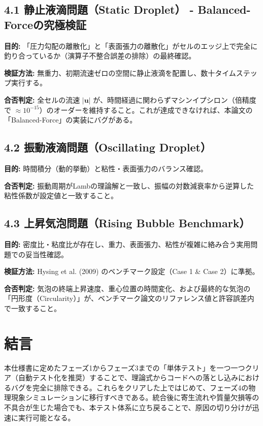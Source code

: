 \documentclass[12pt, a4paper, titlepage]{article}
\begin{document}
\subsection*{4.1 静止液滴問題（Static Droplet） - Balanced-Forceの究極検証}

\textbf{目的:} 「圧力勾配の離散化」と「表面張力の離散化」がセルのエッジ上で完全に釣り合っているか（演算子不整合誤差の排除）の最終確認。

\textbf{検証方法:} 無重力、初期流速ゼロの空間に静止液滴を配置し、数十タイムステップ実行する。

\textbf{合否判定:} 全セルの流速 $|\mathbf{u}|$ が、時間経過に関わらずマシンイプシロン（倍精度で $\approx 10^{-15}$）のオーダーを維持すること。これが達成できなければ、本論文の「Balanced-Force」の実装にバグがある。

\subsection*{4.2 振動液滴問題（Oscillating Droplet）}

\textbf{目的:} 時間積分（動的挙動）と粘性・表面張力のバランス確認。

\textbf{合否判定:} 振動周期がLambの理論解と一致し、振幅の対数減衰率から逆算した粘性係数が設定値と一致すること。

\subsection*{4.3 上昇気泡問題（Rising Bubble Benchmark）}

\textbf{目的:} 密度比・粘度比が存在し、重力、表面張力、粘性が複雑に絡み合う実用問題での妥当性確認。

\textbf{検証方法:} Hysing et al. (2009) のベンチマーク設定（Case 1 \& Case 2）に準拠。

\textbf{合否判定:} 気泡の終端上昇速度、重心位置の時間変化、および最終的な気泡の「円形度（Circularity）」が、ベンチマーク論文のリファレンス値と許容誤差内で一致すること。

\section*{結言}

本仕様書に定めたフェーズ1からフェーズ3までの「単体テスト」を一つ一つクリア（自動テスト化を推奨）することで、理論式からコードへの落とし込みにおけるバグを完全に排除できる。これらをクリアした上ではじめて、フェーズ4の物理現象シミュレーションに移行すべきである。統合後に寄生流れや質量欠損等の不具合が生じた場合でも、本テスト体系に立ち戻ることで、原因の切り分けが迅速に実行可能となる。
\end{document}
